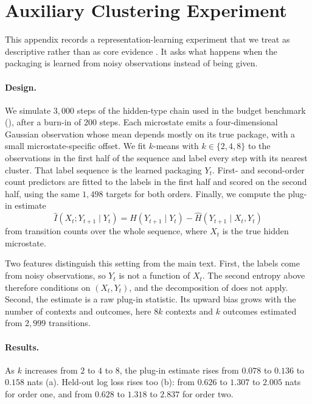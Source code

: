\section{Auxiliary Clustering Experiment}\label{app:aux-rep}

This appendix records a representation-learning experiment that we treat as descriptive rather than as core evidence \citep{tishby1999bottleneck,geiger2015optimalkullbackleibleraggregation}. It asks what happens when the packaging is learned from noisy observations instead of being given.

\paragraph{Design.} We simulate $3{,}000$ steps of the hidden-type chain used in the budget benchmark (), after a burn-in of $200$ steps. Each microstate emits a four-dimensional Gaussian observation whose mean depends mostly on its true package, with a small microstate-specific offset. We fit $k$-means \citep{macqueen1967somemethods} with $k\in\{2,4,8\}$ to the observations in the first half of the sequence and label every step with its nearest cluster. That label sequence is the learned packaging $Y_t$. First- and second-order count predictors are fitted to the labels in the first half and scored on the second half, using the same $1{,}498$ targets for both orders. Finally, we compute the plug-in estimate
\[
\widehat I(X_t;Y_{t+1}\mid Y_t)=\widehat H(Y_{t+1}\mid Y_t)-\widehat H(Y_{t+1}\mid X_t,Y_t)
\]
from transition counts over the whole sequence, where $X_t$ is the true hidden microstate.

Two features distinguish this setting from the main text. First, the labels come from noisy observations, so $Y_t$ is not a function of $X_t$. The second entropy above therefore conditions on $(X_t,Y_t)$, and the decomposition of  does not apply. Second, the estimate is a raw plug-in statistic. Its upward bias grows with the number of contexts and outcomes, here $8k$ contexts and $k$ outcomes estimated from $2{,}999$ transitions.

\paragraph{Results.} As $k$ increases from $2$ to $4$ to $8$, the plug-in estimate rises from $0.078$ to $0.136$ to $0.158$ nats (a). Held-out log loss rises too (b): from $0.626$ to $1.307$ to $2.005$ nats for order one, and from $0.628$ to $1.318$ to $2.837$ for order two.

